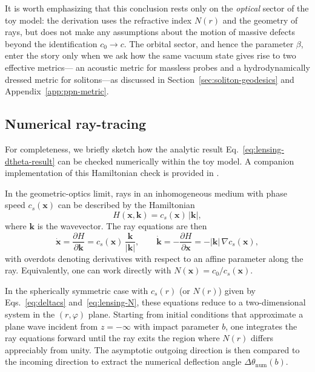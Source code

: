 \documentclass[11pt]{article}
\begin{document}
It is worth emphasizing that this conclusion rests only on the
\emph{optical} sector of the toy model: the derivation uses the refractive
index $N(r)$ and the geometry of rays, but does not make any assumptions
about the motion of massive defects beyond the identification $c_0 \to c$.
The orbital sector, and hence the parameter $\beta$, enter the story only
when we ask how the same vacuum state gives rise to two effective metrics---
an acoustic metric for massless probes and a hydrodynamically dressed
metric for solitons---as discussed in Section~\ref{sec:soliton-geodesics}
and Appendix~\ref{app:ppn-metric}.


\subsection{Numerical ray-tracing}
\label{subsec:lensing-numerics}

For completeness, we briefly sketch how the analytic result
Eq.~\eqref{eq:lensing-dtheta-result} can be checked numerically within the
toy model.  A companion implementation of this Hamiltonian check is provided
in .

In the geometric-optics limit, rays in an inhomogeneous medium with phase
speed $c_s(\mathbf{x})$ can be described by the Hamiltonian
\begin{equation}
  H(\mathbf{x},\mathbf{k})
  = c_s(\mathbf{x})\,|\mathbf{k}|,
\end{equation}
where $\mathbf{k}$ is the wavevector.
The ray equations are then
\begin{equation}
  \dot{\mathbf{x}} = \frac{\partial H}{\partial \mathbf{k}}
  = c_s(\mathbf{x})\,\frac{\mathbf{k}}{|\mathbf{k}|},
  \qquad
  \dot{\mathbf{k}} = -\frac{\partial H}{\partial \mathbf{x}}
  = -|\mathbf{k}|\,\nabla c_s(\mathbf{x}),
\end{equation}
with overdots denoting derivatives with respect to an affine parameter
along the ray.
Equivalently, one can work directly with $N(\mathbf{x}) = c_0 / c_s(\mathbf{x})$.

In the spherically symmetric case with $c_s(r)$ (or $N(r)$) given by
Eqs.~\eqref{eq:deltacs} and~\eqref{eq:lensing-N}, these equations reduce to
a two-dimensional system in the $(r,\varphi)$ plane.
Starting from initial conditions that approximate a plane wave incident from
$z = -\infty$ with impact parameter $b$, one integrates the ray equations
forward until the ray exits the region where $N(r)$ differs appreciably
from unity.
The asymptotic outgoing direction is then compared to the incoming direction
to extract the numerical deflection angle $\Delta\theta_{\text{num}}(b)$.
\end{document}
